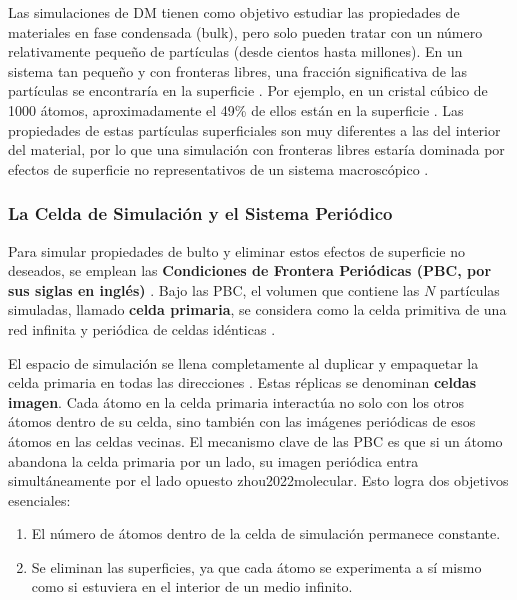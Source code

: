 Las simulaciones de DM tienen como objetivo estudiar las propiedades de materiales en fase condensada (bulk), pero solo pueden tratar con un número relativamente pequeño de partículas (desde cientos hasta millones). En un sistema tan pequeño y con fronteras libres, una fracción significativa de las partículas se encontraría en la superficie \cite[65]{frenkel2002understanding}. Por ejemplo, en un cristal cúbico de 1000 átomos, aproximadamente el 49\% de ellos están en la superficie \cite[65]{frenkel2002understanding}. Las propiedades de estas partículas superficiales son muy diferentes a las del interior del material, por lo que una simulación con fronteras libres estaría dominada por efectos de superficie no representativos de un sistema macroscópico \cite[218]{haile1992molecular}.

\subsubsection{La Celda de Simulación y el Sistema Periódico}

Para simular propiedades de bulto y eliminar estos efectos de superficie no deseados, se emplean las \textbf{Condiciones de Frontera Periódicas (PBC, por sus siglas en inglés)} \cite[218]{haile1992molecular}. Bajo las PBC, el volumen que contiene las $N$ partículas simuladas, llamado \textbf{celda primaria}, se considera como la celda primitiva de una red infinita y periódica de celdas idénticas \cite[65]{frenkel2002understanding}.

El espacio de simulación se llena completamente al duplicar y empaquetar la celda primaria en todas las direcciones \cite[16]{zhou2022molecular}. Estas réplicas se denominan \textbf{celdas imagen}. Cada átomo en la celda primaria interactúa no solo con los otros átomos dentro de su celda, sino también con las imágenes periódicas de esos átomos en las celdas vecinas. El mecanismo clave de las PBC es que si un átomo abandona la celda primaria por un lado, su imagen periódica entra simultáneamente por el lado opuesto \cite[85, 16]{haile1992molecular}{zhou2022molecular}. Esto logra dos objetivos esenciales:
\begin{enumerate}
    \item El número de átomos dentro de la celda de simulación permanece constante.
    \item Se eliminan las superficies, ya que cada átomo se experimenta a sí mismo como si estuviera en el interior de un medio infinito.
\end{enumerate}

